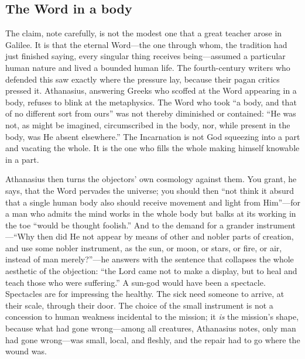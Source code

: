 \subsection{The Word in a body}

The claim, note carefully, is not the modest one that a great teacher arose in Galilee. It is that the eternal Word---the one through whom, the tradition had just finished saying, every singular thing receives being---assumed a particular human nature and lived a bounded human life. The fourth-century writers who defended this saw exactly where the pressure lay, because their pagan critics pressed it. Athanasius, answering Greeks who scoffed at the Word appearing in a body, refuses to blink at the metaphysics. The Word who took ``a body, and that of no different sort from ours'' was not thereby diminished or contained: ``He was not, as might be imagined, circumscribed in the body, nor, while present in the body, was He absent elsewhere.'' The Incarnation is not God squeezing into a part and vacating the whole. It is the one who fills the whole making himself knowable in a part.

Athanasius then turns the objectors' own cosmology against them. You grant, he says, that the Word pervades the universe; you should then ``not think it absurd that a single human body also should receive movement and light from Him''---for a man who admits the mind works in the whole body but balks at its working in the toe ``would be thought foolish.'' And to the demand for a grander instrument---``Why then did He not appear by means of other and nobler parts of creation, and use some nobler instrument, as the sun, or moon, or stars, or fire, or air, instead of man merely?''---he answers with the sentence that collapses the whole aesthetic of the objection: ``the Lord came not to make a display, but to heal and teach those who were suffering.'' A sun-god would have been a spectacle. Spectacles are for impressing the healthy. The sick need someone to arrive, at their scale, through their door. The choice of the small instrument is not a concession to human weakness incidental to the mission; it \emph{is} the mission's shape, because what had gone wrong---among all creatures, Athanasius notes, only man had gone wrong---was small, local, and fleshly, and the repair had to go where the wound was.

